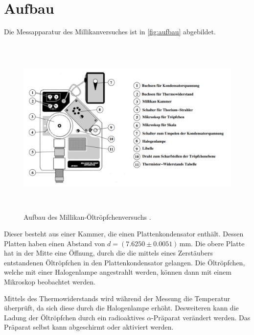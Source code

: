 \section{Aufbau}
\label{sec:Aufbau}

Die Messapparatur des Millikanversuches ist in \autoref{fig:aufbau} abgebildet.

\begin{figure}
    \centering
    \includegraphics[height = 9cm]{Aufbau.pdf}
    \caption{Aufbau des Millikan-Öltröpfchenversuchs \cite{ap503}.}
    \label{fig:aufbau}
\end{figure}

Dieser besteht aus einer Kammer, die einen Plattenkondensator enthält. Dessen Platten 
haben einen Abstand von $d = (7.6250 \pm 0.0051) \,\unit{\milli\meter}$. Die obere
Platte hat in der Mitte eine Öffnung, durch die die mittels eines Zerstäubers 
entstandenen Öltröpfchen in den Plattenkondensator gelangen. Die Öltröpfchen, welche 
mit einer Halogenlampe angestrahlt werden, können
dann mit einem Mikroskop beobachtet werden.

Mittels des Thermowiderstands wird während der Messung die Temperatur überprüft, da sich
diese durch die Halogenlampe erhöht. Desweiteren kann die Ladung der 
Öltröpfchen durch ein radioaktives $\alpha$-Präparat verändert werden. Das Präparat 
selbst kann abgeschirmt oder aktiviert werden. 